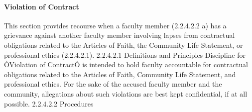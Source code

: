 \documentclass[letterpaper, 11pt]{article}
\begin{document}
			\paragraph{Violation of Contract}
				This section provides recourse when a faculty member (2.2.4.2.2 a) has a grievance against another faculty member involving lapses from contractual obligations related to the Articles of Faith, the Community Life Statement, or professional ethics (2.2.4.2.1).
				2.2.4.2.1 Definitions and Principles
				Discipline for ÒViolation of ContractÓ is intended to hold faculty accountable for contractual obligations related to the Articles of Faith, Community Life Statement, and professional ethics.  For the sake of the accused faculty member and the community, allegations about such violations are best kept confidential, if at all possible.
				2.2.4.2.2 Procedures
\end{document}
